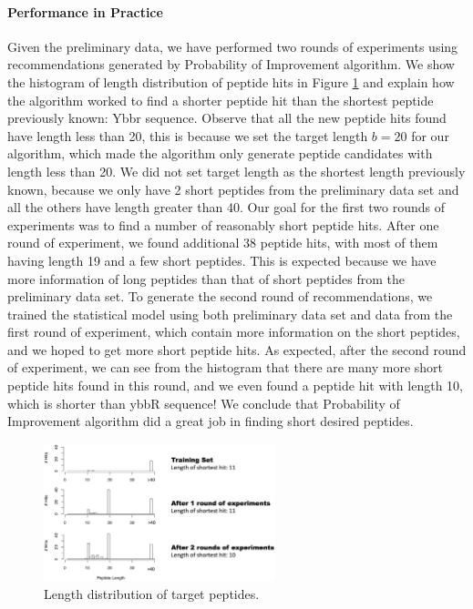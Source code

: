 \documentclass[12pt]{article}
\begin{document}
\paragraph{Performance in Practice} \label{sec:experiment}
Given the preliminary data, we have performed two rounds of experiments using recommendations generated by Probability of Improvement algorithm. We show the histogram of length distribution of peptide hits in Figure \ref{fig:experiment} and explain how the algorithm worked to find a shorter peptide hit than the shortest peptide previously known: Ybbr sequence. Observe that all the new peptide hits found have length less than 20, this is because we set the target length $b = 20$ for our algorithm, which made the algorithm only generate peptide candidates with length less than 20. We did not set target length as the shortest length previously known, because we only have 2 short peptides from the preliminary data set and all the others have length greater than 40. Our goal for the first two rounds of experiments was to find a number of reasonably short peptide hits. After one round of experiment, we found additional 38 peptide hits, with most of them having length 19 and a few short peptides. This is expected because we have more information of long peptides than that of short peptides from the preliminary data set. To generate the second round of recommendations, we trained the statistical model using both preliminary data set and data from the first round of experiment, which contain more information on the short peptides, and we hoped to get more short peptide hits. As expected, after the second round of experiment, we can see from the histogram that there are many more short peptide hits found in this round, and we even found a peptide hit with length 10, which is shorter than ybbR sequence! We conclude that Probability of Improvement algorithm did a great job in finding short desired peptides.

\begin{figure}[hpt] 
\center
\includegraphics[width=0.6\textwidth]{pic/experiment.png}
\caption{Length distribution of target peptides.}
\label{fig:experiment}
\end{figure}
\end{document}
